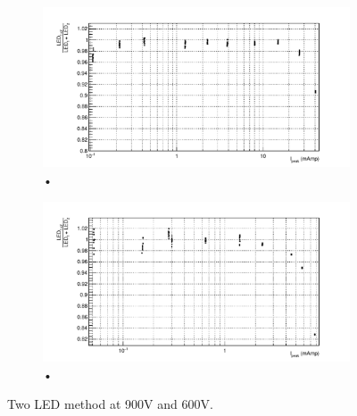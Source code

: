 \begin{figure}
\centering
\begin{subfigure}[b]{\textwidth}
\includegraphics[width=\textwidth]{chapters/graphs/PMTchar/PMT900V_linearity2LEDmethod.pdf}
\caption{•}
\end{subfigure}
\begin{subfigure}[b]{\textwidth}
\includegraphics[width=\textwidth]{chapters/graphs/PMTchar/PMT600V_linearity2LEDmethod.pdf}
\caption{•}
\end{subfigure}
\caption{Two LED method at 900V and 600V.}
\end{figure}

